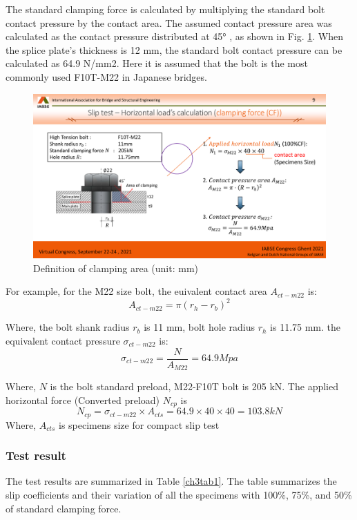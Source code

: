 The standard clamping force is calculated by multiplying the standard bolt contact pressure by the contact area. The assumed contact pressure area was calculated as the contact pressure distributed at 45° \cite{rotscher1927maschinenelemente}, as shown in Fig. \ref{ch3fig8}. When the splice plate's thickness is 12 mm, the standard bolt contact pressure can be calculated as 64.9 N/mm2. Here it is assumed that the bolt is the most commonly used F10T-M22 in Japanese bridges.


\begin{figure}
\centering
\includegraphics[width=0.65\linewidth]{imgs/ch3/fig8.pdf}
\caption{Definition of clamping area (unit: mm)}
\label{ch3fig8}  
\end{figure}

For example, for the M22 size bolt, the euivalent contact area $A_{ct-m22}$ is:
\begin{equation*}
    A_{ct-m22} = \pi (r_h-r_b)^2
\end{equation*}

Where, the  bolt shank radius $r_b$ is 11 mm, bolt hole radius $r_h$ is 11.75 mm.
the equivalent contact pressure $\sigma_{ct-m22}$ is:
\begin{equation*}
    \sigma_{ct-m22} = \frac{N}{A_{M22}} = 64.9 Mpa
\end{equation*}

Where, $N$ is the bolt standard preload, M22-F10T bolt is 205 kN.
The applied horizontal force (Converted preload) $N_{cp}$ is 
\begin{equation*}
    N_{cp} = \sigma_{ct-m22} \times A_{cts} =64.9 \times 40 \times 40 = 103.8 kN
\end{equation*}
Where, $A_{cts}$ is specimens size for compact slip test


\subsubsection{Test result}

The test results are summarized in Table \ref{ch3tab1}. The table summarizes the slip coefficients and their variation of all the specimens with 100\%, 75\%, and 50\% of standard clamping force.

